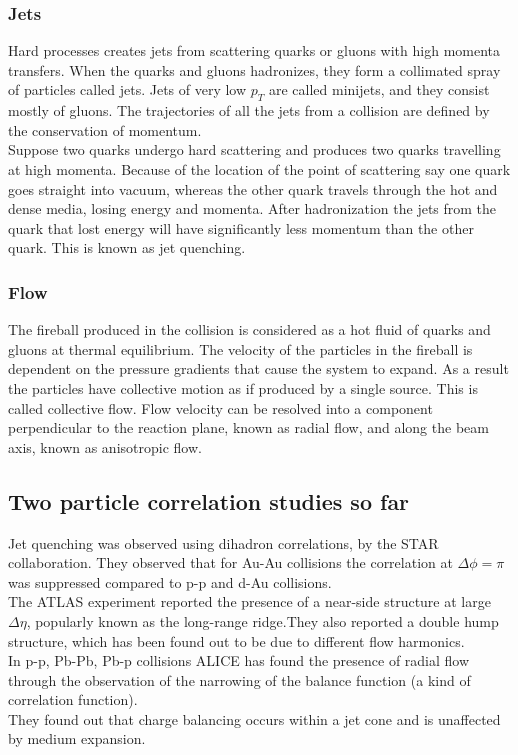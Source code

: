 \documentclass[12pt,a4paper,twoside]{report}
\begin{document}
\subsubsection{Jets}
Hard processes creates jets from scattering quarks or gluons with high momenta transfers. When the quarks and gluons hadronizes, they form a collimated spray of particles called jets. Jets of very low $p_T$ are called minijets, and they consist mostly of gluons. The trajectories of all the jets from a collision are defined by the conservation of momentum.\\
Suppose two quarks undergo hard scattering and produces two quarks travelling at high momenta. Because of the location of the point of scattering say one quark goes straight into vacuum, whereas the other quark travels through the hot and dense media, losing energy and momenta. After hadronization the jets from the quark that lost energy will have significantly less momentum than the other quark. This is known as jet quenching.
\subsubsection{Flow}
The fireball produced in the collision is considered as a hot fluid of quarks and gluons at thermal equilibrium. The velocity of the particles in the fireball is dependent on the pressure gradients that cause the system to expand. As a result the particles have collective motion as if produced by a single source. This is called collective flow. Flow velocity can be resolved into a component perpendicular to the reaction plane, known as radial flow, and along the beam axis, known as anisotropic flow.
\subsection{Two particle correlation studies so far}
Jet quenching was observed using dihadron correlations, by the STAR collaboration. They observed that for Au-Au collisions the correlation at $\Delta\phi=\pi$ was suppressed compared to p-p and d-Au collisions.\\
The ATLAS experiment reported the presence of a near-side structure at large $\Delta\eta$, popularly known as the long-range ridge.They also reported a double hump structure, which has been found out to be due to different flow harmonics.\\
In p-p, Pb-Pb, Pb-p collisions ALICE has found the presence of radial flow through the observation of the narrowing of the balance function (a kind of correlation function).\\ They found out that charge balancing occurs within a jet cone and is unaffected by medium expansion.\\
\end{document}
